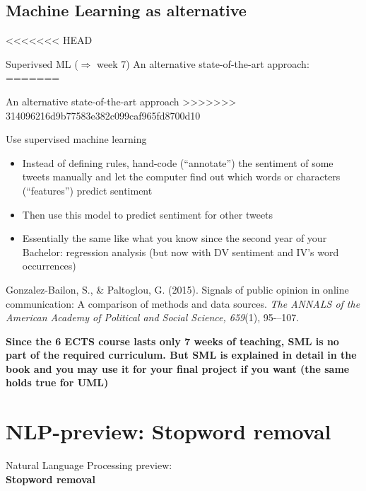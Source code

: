 \documentclass{beamer}
\begin{document}
\subsection{Machine Learning as alternative}
<<<<<<< HEAD
\begin{frame}{Superivsed ML ($\Rightarrow$ week 7)}
	An alternative state-of-the-art approach:
=======
\begin{frame}{An alternative state-of-the-art approach}
>>>>>>> 314096216d9b77583e382c099caf965fd8700d10
	\begin{block}{Use supervised machine learning}
		\begin{itemize}
			\item Instead of defining rules, hand-code (``annotate'') the sentiment of some tweets manually and let the computer find out which words or characters (``features'') predict sentiment
			\item Then use this model to predict sentiment for other tweets
			\item Essentially the same like what you know since the second year of your Bachelor: regression analysis (but now with DV sentiment and IV's word occurrences)
		\end{itemize}
		\tiny{Gonzalez-Bailon, S., \& Paltoglou, G. (2015). Signals of public opinion in online communication: A comparison of methods and data sources. \emph{The ANNALS of the American Academy of Political and Social Science, 659}(1), 95-–107.}
	\end{block}
        
        \textbf{Since the 6 ECTS course lasts only 7 weeks of teaching, SML is no part of the required curriculum. But SML is explained in detail in the book and you may use it for your final project if you want (the same holds true for UML)}
         
\end{frame}




\section[Stopword removal]{NLP-preview: Stopword removal}
\begin{frame}
Natural Language Processing preview:\\
\textbf{Stopword removal} \\
\vspace{1cm}
\end{frame}


\end{frame}
\end{document}
